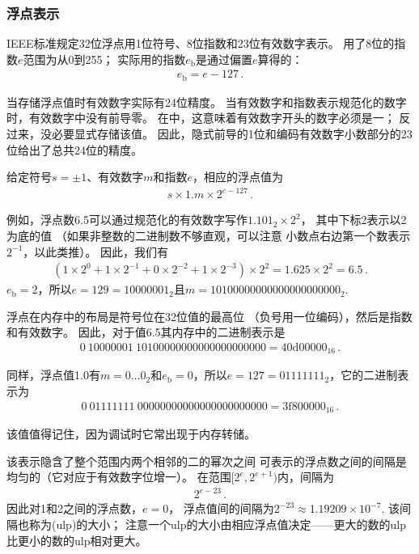 \subsubsection*{浮点表示}
IEEE标准规定32位浮点用1位符号、8位指数和23位有效数字表示。
用了8位的指数$e$范围为从0到255；
实际用的指数$e_{\mathrm{b}}$是通过偏置$e$算得的：
\begin{align*}
    e_{\mathrm{b}}=e-127\, .
\end{align*}

当存储浮点值时有效数字实际有24位精度。
当有效数字和指数表示规范化的数字时，有效数字中没有前导零。
在中，这意味着有效数字开头的数字必须是一；
反过来，没必要显式存储该值。
因此，隐式前导的1位和编码有效数字小数部分的23位给出了总共24位的精度。

给定符号$s=\pm 1$、有效数字$m$和指数$e$，相应的浮点值为
\begin{align*}
    s\times 1.m\times2^{e-127}\, .
\end{align*}

例如，浮点数6.5可以通过规范化的有效数字写作$1.101_2\times2^2$，
其中下标2表示以2为底的值
（如果非整数的二进制数不够直观，可以注意
小数点右边第一个数表示$2^{-1}$，以此类推）。
因此，我们有
\begin{align*}
    (1\times2^0+1\times2^{-1}+0\times2^{-2}+1\times2^{-3})\times2^2=1.625\times2^2=6.5\, .
\end{align*}
$e_{\mathrm{b}}=2$，所以$e=129=10000001_2$且$m=10100000000000000000000_2$.

浮点在内存中的布局是符号位在32位值的最高位
（负号用一位编码），然后是指数和有效数字。
因此，对于值6.5其内存中的二进制表示是
\begin{align*}
    0\ 10000001\ 10100000000000000000000=40\mathrm{d}00000_{16}\, .
\end{align*}

同样，浮点值1.0有$m=0\ldots0_2$和$e_{\mathrm{b}}=0$，所以$e=127=01111111_2$，它的二进制表示为
\begin{align*}
    0\ 01111111\ 00000000000000000000000=3\mathrm{f}800000_{16}\, .
\end{align*}

该值值得记住，因为调试时它常出现于内存转储。

该表示隐含了整个范围内两个相邻的二的幂次之间
可表示的浮点数之间的间隔是均匀的（它对应于有效数字位增一）。
在范围$[2^e,2^{e+1})$内，间隔为
\begin{align}\label{eq:3.6}
    2^{e-23}\, .
\end{align}
因此对1和2之间的浮点数，$e=0$，
浮点值间的间隔为$2^{-23}\approx1.19209\times10^{-7}$.
该间隔也称为(ulp)的大小；
注意一个ulp的大小由相应浮点值决定——更大的数的ulp比更小的数的ulp相对更大。

